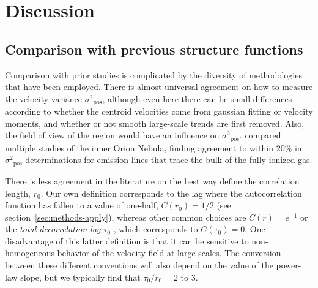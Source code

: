 \documentclass[fleqn,usenatbib, useAMS, a4paper]{mnras}
\newcommand\pos{\ensuremath{_{\mathrm{pos}}}}
\begin{document}



\section{Discussion}\label{sec:discussion}

\subsection{Comparison with previous structure functions}
\label{sec:comp-with-prev}
Comparison with prior studies is complicated by the
diversity of methodologies that  have been employed.
There is almost universal agreement on how to measure
the velocity variance \(\sigma^2\pos\),
although even here there can be small differences according
to whether the centroid velocities come from gaussian fitting
or velocity moments,
and whether or not smooth large-scale trends are first removed.
Also, the field of view of the region would have an influence on \(\sigma^2\pos\).
\citet{arthur2016turbulence} compared multiple studies of the
inner Orion Nebula, finding agreement to within 20\%
in \(\sigma^2\pos\) determinations
for emission lines that trace the bulk of the fully ionized gas.

There is less agreement in the literature on the best way
define the correlation length, \(r_0\).
Our own definition corresponds to the lag where the autocorrelation function
has fallen to a value of one-half,
\(C(r_0) = 1/2\) (see section~\ref{sec:methods-apply}),
whereas other common choices are \(C(r) = e^{-1}\)
\citep{Mivi1995}
or the \textit{total decorrelation lag} \(\tau_0\) \citep{lagrois2011},
which corresponds to \(C(\tau_0) = 0\).
One disadvantage of this latter definition is that it
can be sensitive to non-homogeneous behavior of the
velocity field at large scales. 
The conversion between these different conventions will also depend
on the value of the power-law slope,
but we typically find that \(\tau_0 / r_0 = \num{2}\) to \num{3}.
\end{document}
